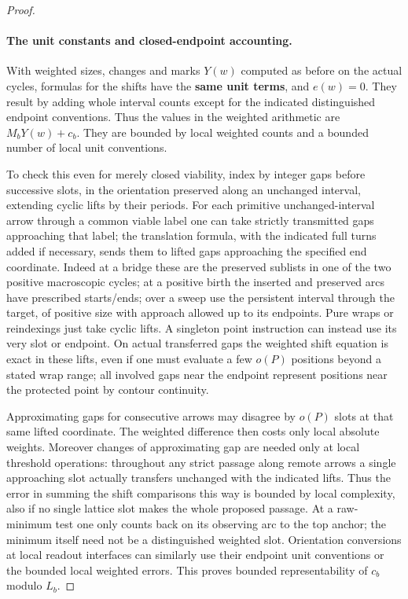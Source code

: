 \begin{proof}
\paragraph{The unit constants and closed-endpoint accounting.}

With weighted sizes, changes and marks \(Y(w)\) computed as before on the actual cycles, formulas for the
shifts have the \textbf{same unit terms}, and \(e(w)=0\). They result by adding whole interval counts except
for the indicated distinguished endpoint conventions. Thus the values in the weighted arithmetic are
\(M_bY(w)+c_b\). They are bounded by local weighted counts and a bounded number of local unit conventions.

To check this even for merely closed viability, index by integer gaps before successive slots, in the
orientation preserved along an unchanged interval, extending cyclic lifts by their periods. For each
primitive unchanged-interval arrow through a common viable label one can take strictly transmitted gaps
approaching that label; the translation formula, with the indicated full turns added if necessary, sends
them to lifted gaps approaching the specified end coordinate. Indeed at a bridge these are the preserved
sublists in one of the two positive macroscopic cycles; at a positive birth the inserted and preserved arcs
have prescribed starts/ends; over a sweep use the persistent interval through the target, of positive size
with approach allowed up to its endpoints. Pure wraps or reindexings just take cyclic lifts. A singleton
point instruction can instead use its very slot or endpoint. On actual transferred gaps the weighted shift
equation is exact in these lifts, even if one must evaluate a few \(o(P)\) positions beyond a stated wrap
range; all involved gaps near the endpoint represent positions near the protected point by contour
continuity.

Approximating gaps for consecutive arrows may disagree by \(o(P)\) slots at that same lifted
coordinate. The weighted difference then costs only local absolute weights. Moreover changes of
approximating gap are needed only at local threshold operations: throughout any strict passage along remote
arrows a single approaching slot actually transfers unchanged with the indicated lifts. Thus the error in
summing the shift comparisons this way is bounded by local complexity, also if no single lattice slot makes
the whole proposed passage. At a raw-minimum test one only counts back on its observing arc to the top
anchor; the minimum itself need not be a distinguished weighted slot. Orientation conversions at local
readout interfaces can similarly use their endpoint unit conventions or the bounded local weighted errors.
This proves bounded representability of \(c_b\) modulo \(L_b\).


\end{proof}
